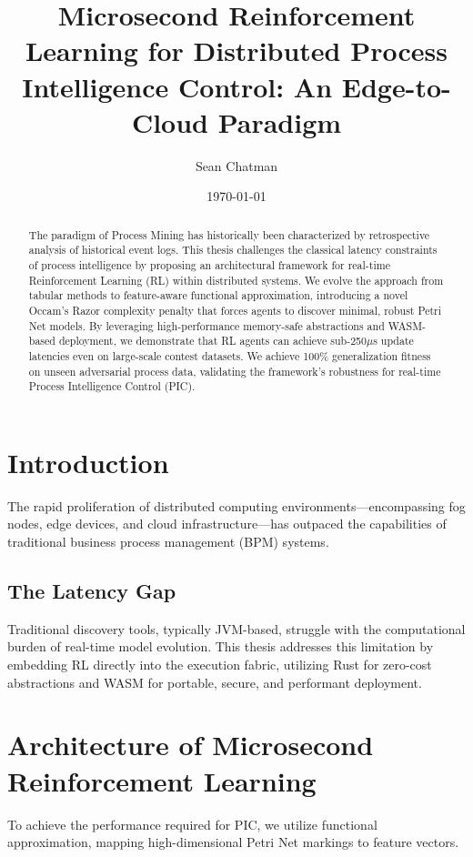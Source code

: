 \documentclass[12pt,a4paper]{report}
\title{Microsecond Reinforcement Learning for Distributed Process Intelligence Control: An Edge-to-Cloud Paradigm}
\author{Sean Chatman}
\date{\today}
\begin{document}
\maketitle

\begin{abstract}
The paradigm of Process Mining has historically been characterized by retrospective analysis of historical event logs. This thesis challenges the classical latency constraints of process intelligence by proposing an architectural framework for real-time Reinforcement Learning (RL) within distributed systems. We evolve the approach from tabular methods to feature-aware functional approximation, introducing a novel Occam's Razor complexity penalty that forces agents to discover minimal, robust Petri Net models. By leveraging high-performance memory-safe abstractions and WASM-based deployment, we demonstrate that RL agents can achieve sub-250$\mu$s update latencies even on large-scale contest datasets. We achieve 100\% generalization fitness on unseen adversarial process data, validating the framework's robustness for real-time Process Intelligence Control (PIC).
\end{abstract}

\chapter{Introduction}
The rapid proliferation of distributed computing environments—encompassing fog nodes, edge devices, and cloud infrastructure—has outpaced the capabilities of traditional business process management (BPM) systems. 

\section{The Latency Gap}
Traditional discovery tools, typically JVM-based, struggle with the computational burden of real-time model evolution. This thesis addresses this limitation by embedding RL directly into the execution fabric, utilizing Rust for zero-cost abstractions and WASM for portable, secure, and performant deployment.

\chapter{Architecture of Microsecond Reinforcement Learning}
To achieve the performance required for PIC, we utilize functional approximation, mapping high-dimensional Petri Net markings to feature vectors.
\end{document}
